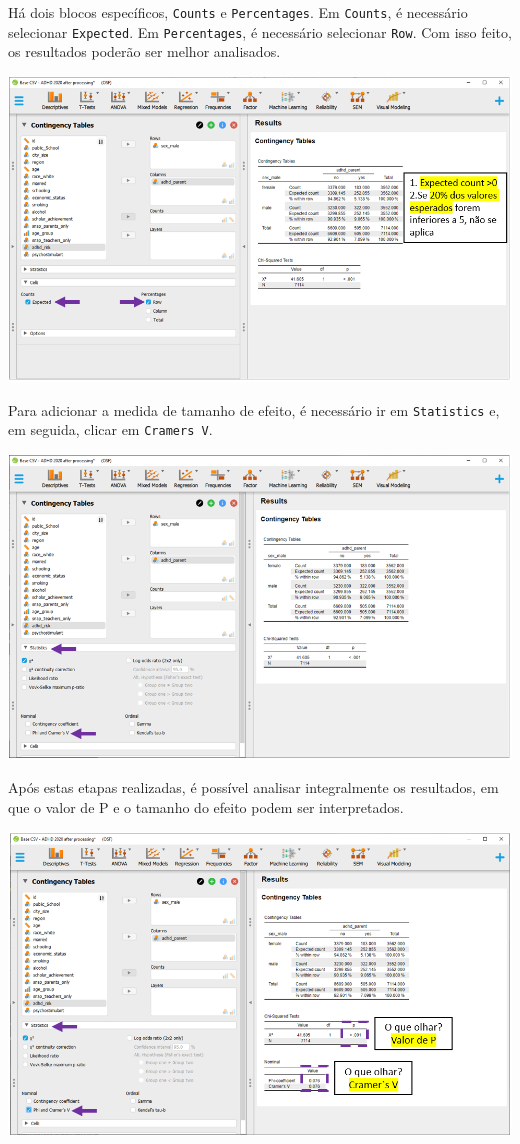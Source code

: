 \documentclass[
]{book}
\begin{document}
Há dois blocos específicos, \texttt{Counts} e \texttt{Percentages}. Em \texttt{Counts}, é necessário selecionar \texttt{Expected}. Em \texttt{Percentages}, é necessário selecionar \texttt{Row}. Com isso feito, os resultados poderão ser melhor analisados.

\includegraphics{./img/cap_x2_pressupostos2.png}

Para adicionar a medida de tamanho de efeito, é necessário ir em \texttt{Statistics} e, em seguida, clicar em \texttt{Cramer\textquotesingle{}s\ V}.

\includegraphics{./img/cap_x2_tamanho_do_efeito.png}

Após estas etapas realizadas, é possível analisar integralmente os resultados, em que o valor de P e o tamanho do efeito podem ser interpretados.

\includegraphics{./img/cap_x2_tabela.png}
\end{document}
